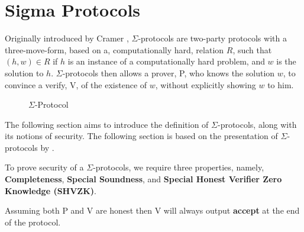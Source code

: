 \section{Sigma Protocols}
\label{sec:background:sigma_protocols}
Originally introduced by Cramer , $\Sigma$-protocols are
two-party protocols with a three-move-form, based on a, computationally hard,
relation $R$, such that $(h, w) \in R$ if $h$ is an instance of a
computationally hard problem, and $w$ is the solution to $h$. $\Sigma$-protocols
then allows a prover, P, who knows the solution $w$, to convince a verify, V, of
the existence of $w$, without explicitly showing $w$ to him.


\begin{figure}[ht]
  \centering
  \caption{\label{fig:proto_sigma} $\Sigma$-Protocol}
\end{figure}


The following section aims to introduce the definition of $\Sigma$-protocols,
along with its notions of security. The following section is based on the
presentation of $\Sigma$-protocols by \citet{on-sigma-protocols}.


\begin{definition}
\label{def:sigma:sec}
To prove security of a $\Sigma$-protocols, we require three properties, namely,
\textbf{Completeness}, \textbf{Special Soundness}, and \textbf{Special Honest Verifier Zero Knowledge (SHVZK)}.
\end{definition}

\begin{definition}[Completeness]
  Assuming both P and V are honest then V will always output \textbf{accept} at
  the end of the protocol.
\end{definition}

